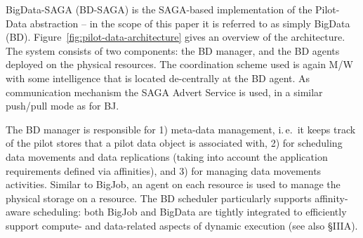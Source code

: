 \documentclass[conference,final]{IEEEtran}
\newcommand{\jhanote}[1]{ {\textcolor{red} { ***shantenu: #1 }}}
\newcommand{\jhanote}[1]{}
\newcommand{\upp}{\vspace*{-0.5em}}
\begin{document}
BigData-SAGA (BD-SAGA) is the SAGA-based implementation of the
Pilot-Data abstraction -- in the scope of this paper it is referred to
as simply BigData (BD).  Figure~\ref{fig:pilot-data-architecture}
gives an overview of the architecture.  The system consists of two
components: the BD manager, and the BD agents deployed on the physical
resources. The coordination scheme used is again M/W with some
intelligence that is located de-centrally at the BD agent. As
communication mechanism the SAGA Advert Service is used, in a similar
push/pull mode as for BJ.

The BD manager is responsible for 1) meta-data management, i.\,e.\ it
keeps track of the pilot stores that a pilot data object is associated
with, 2) for scheduling data movements and data replications (taking
into account the application requirements defined via affinities), and
3) for managing data movements activities.  Similar to BigJob, an
agent on each resource is used to manage the physical storage on a
resource.  The BD scheduler particularly supports affinity-aware
scheduling: both BigJob and BigData are tightly integrated to
efficiently support compute- and data-related aspects of dynamic
execution (see also \S{IIIA}).


% 






\end{document}
